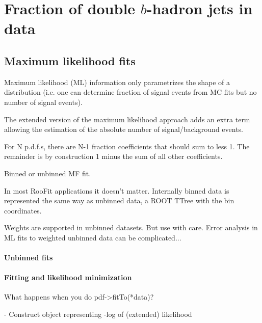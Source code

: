 %
%
\chapter{Fraction of double $b$-hadron jets in data}\label{ch:gbbfraction}

\section{Maximum likelihood fits}\label{sec:LLFits}

Maximum likelihood (ML) information only parametrizes the shape of a 
distribution (i.e. one can determine fraction of signal events from 
MC fits but no number of signal events).

The extended version of the maximum likelihood approach adds an extra term
allowing the estimation of the absolute number of signal/background events.

For N p.d.f.s, there are N-1 fraction coefficients that should sum to less 1. The remainder is by construction 1 minus the sum of all other coefficients.


Binned or unbinned MF fit. %

In most RooFit applications it doesn't matter. Internally binned data is represented the same way as unbinned data, a ROOT TTree with the bin coordinates.

Weights are supported in unbinned datasets. But use with care. Error analysis in ML fits to weighted unbinned data can be complicated...

\subsubsection{Unbinned fits}


\subsubsection{Fitting and likelihood minimization}

What happens when you do pdf->fitTo(*data)?

- Construct object representing -log of (extended) likelihood

